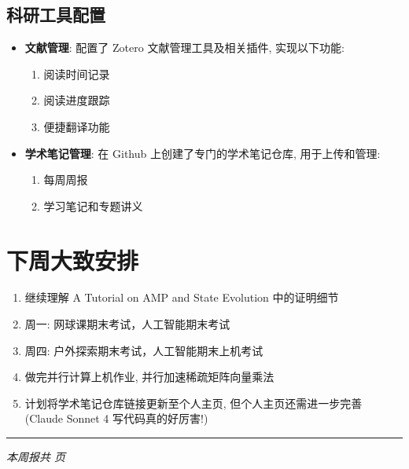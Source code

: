 \documentclass[12pt,a4paper]{article}
\begin{document}
\subsection{科研工具配置}
\begin{itemize}
    \item \textbf{文献管理}: 配置了 Zotero 文献管理工具及相关插件, 实现以下功能:
    \begin{enumerate}
        \item 阅读时间记录
        \item 阅读进度跟踪
        \item 便捷翻译功能
    \end{enumerate}
    \item \textbf{学术笔记管理}: 在 Github 上创建了专门的学术笔记仓库, 用于上传和管理:
    \begin{enumerate}
        \item 每周周报
        \item 学习笔记和专题讲义
    \end{enumerate}
\end{itemize}



\section{下周大致安排}

\begin{enumerate}
    \item 继续理解 A Tutorial on AMP and State Evolution 中的证明细节
    \item 周一: 网球课期末考试，人工智能期末考试
    \item 周四: 户外探索期末考试，人工智能期末上机考试 
    \item 做完并行计算上机作业, 并行加速稀疏矩阵向量乘法
    \item 计划将学术笔记仓库链接更新至个人主页, 但个人主页还需进一步完善 (Claude Sonnet 4 写代码真的好厉害!)
\end{enumerate}


\vspace{1cm}
\noindent\rule{\textwidth}{0.5pt}
\begin{center}
\textit{本周报共 \pageref{LastPage} 页}
\end{center}
\end{document}

